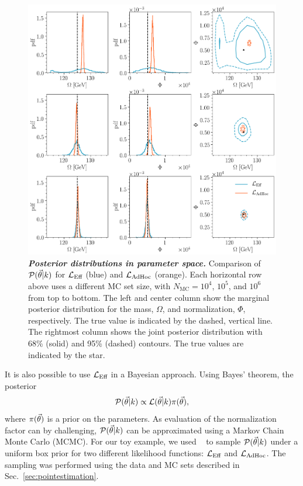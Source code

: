 \begin{figure}[ht]
\centering
    \includegraphics[width=1\linewidth]{fig/fig6}
\caption{\textbf{\textit{Posterior distributions in parameter space.}} Comparison of $\mathcal{P}(\vec{\theta}|k)$ for $\mathcal{L}_\textmd{Eff}$ (blue) and $\mathcal{L}_{\textmd{AdHoc}}$ (orange).
Each horizontal row above uses a different MC set size, with $N_\mathrm{MC}=10^4$, $10^5$, and $10^6$ from top to bottom.
The left and center column show the marginal posterior distribution for the mass, $\Omega$, and normalization, $\Phi$, respectively.
The true value is indicated by the dashed, vertical line.
The rightmost column shows the joint posterior distribution with 68\% (solid) and 95\% (dashed) contours.
The true values are indicated by the star.}
\label{fig:llhdist}
\end{figure}

It is also possible to use $\mathcal{L}_\textmd{Eff}$ in a Bayesian approach.
Using Bayes' theorem, the posterior
\begin{equation}
\mathcal{P}(\vec{\theta}|k) \propto \mathcal{L}(\vec{\theta}|k) \pi(\vec{\theta}),
\end{equation}
where $\pi(\vec{\theta})$ is a prior on the parameters.
As evaluation of the normalization factor can by challenging, $\mathcal{P}(\vec{\theta}|k)$ can be approximated using a Markov Chain Monte Carlo (MCMC).
For our toy example, we used \emcee{}~\cite{ForemanMackey:2012ig} to sample $\mathcal{P}(\vec{\theta}|k)$ under a uniform box prior for two different likelihood functions: $\mathcal{L}_\textmd{Eff}$ and $\mathcal{L}_{\textmd{AdHoc}}$.
The sampling was performed using the data and MC sets described in Sec.~\ref{sec:pointestimation}.

